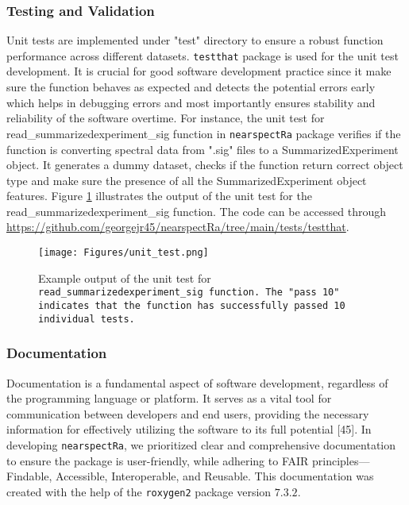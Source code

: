 \documentclass[12pt,a4paper]{report}
\begin{document}
\subsubsection*{Testing and Validation} 
Unit tests are implemented under "test" directory to ensure a robust function performance across different datasets. \texttt{testthat} package is used for the unit test development. It is crucial for good software development practice since it make sure the function behaves as expected and detects the potential errors early which helps in debugging errors and most importantly ensures stability and reliability of the software overtime. For instance, the unit test for read\_summarizedexperiment\_sig function in \texttt{nearspectRa} package verifies if the function is converting spectral data from ".sig" files to  a SummarizedExperiment object. It generates a dummy dataset, checks if the function return correct object type and make sure the presence of all the SummarizedExperiment object features. Figure \ref{fig:unit_test} illustrates the output of the unit test for the read\_summarizedexperiment\_sig  function. The code can be accessed through \url{https://github.com/georgejr45/nearspectRa/tree/main/tests/testthat}.

\begin{figure}[h]
    \centering
    \texttt{[image: Figures/unit\_test.png]}
    \caption{Example output of the unit test for \texttt{read\_summarizedexperiment\_sig function. The "pass 10" indicates that the function has successfully passed 10 individual tests. }}
    \label{fig:unit_test}
\end{figure}



\subsubsection*{Documentation} 
Documentation is a fundamental aspect of software development, regardless of the programming language or platform. It serves as a vital tool for communication between developers and end users, providing the necessary information for effectively utilizing the software to its full potential [45]. In developing \texttt{nearspectRa}, we prioritized clear and comprehensive documentation to ensure the package is user-friendly, while adhering to FAIR principles—Findable, Accessible, Interoperable, and Reusable. This documentation was created with the help of the \texttt{roxygen2} package version $7.3.2$.
\end{document}
